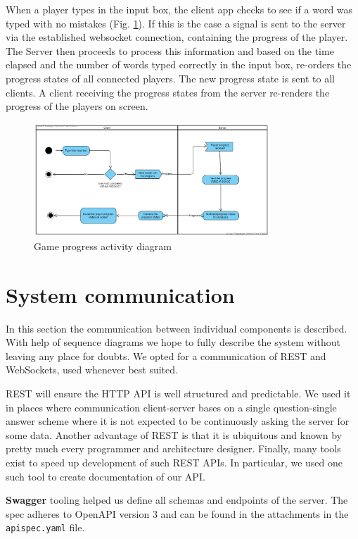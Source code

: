 \documentclass[titlepage]{article}
\newcommand{\figref}[1]{{(Fig. \hypersetup{linkcolor=blue}\ref{#1})}}
\begin{document}
When a player types in the input box, the client app checks to see if a word was typed with no mistakes \figref{fig:progress-activity}. If this is the case a signal is sent to the server via the established websocket connection, containing the progress of the player. The Server then proceeds to process this information and based on the time elapsed and the number of words typed correctly in the input box, re-orders the progress states of all connected players. The new progress state is sent to all clients. A client receiving the progress states  from the server re-renders the progress of the players on screen.


\begin{figure}[H]
	\centering
	\includegraphics[width=0.79\textwidth]{activity_diagram_progress.png}
	\caption{Game progress activity diagram}
	\label{fig:progress-activity}
\end{figure}


\section{System communication}

In this section the communication between individual components is described. With help of sequence diagrams we hope to fully describe the system without leaving any place for doubts. We opted for a communication of REST and WebSockets, used whenever best suited.

REST will ensure the HTTP API is well structured and predictable. We used it in places where communication client-server bases on a single question-single answer scheme where it is not expected to be continuously asking the server for some data. Another advantage of REST is that it is ubiquitous and known by pretty much every programmer and architecture designer. Finally, many tools exist to speed up development of such REST APIs. In particular, we used one such tool to create documentation of our API.

\textbf{Swagger} tooling helped us define all schemas and endpoints of the server. The spec adheres to OpenAPI version 3 and can be found in the attachments in the \texttt{apispec.yaml} file.
\end{document}
